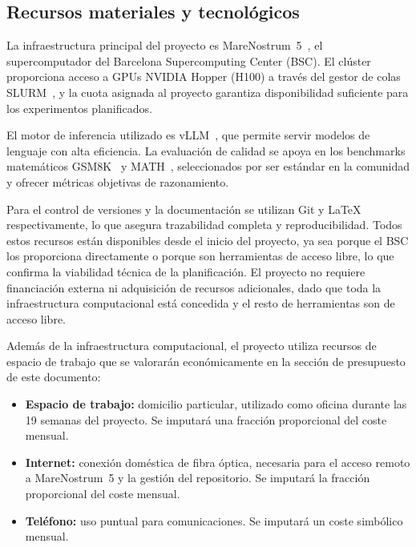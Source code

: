 \documentclass[11pt,a4paper]{article}
\begin{document}
\subsection{Recursos materiales y tecnológicos}

La infraestructura principal del proyecto es MareNostrum~5~\cite{mn5}, el supercomputador del Barcelona Supercomputing Center (BSC). El clúster proporciona acceso a GPUs NVIDIA Hopper (H100) a través del gestor de colas SLURM~\cite{slurm}, y la cuota asignada al proyecto garantiza disponibilidad suficiente para los experimentos planificados.

El motor de inferencia utilizado es vLLM~\cite{vllm2023}, que permite servir modelos de lenguaje con alta eficiencia. La evaluación de calidad se apoya en los benchmarks matemáticos GSM8K~\cite{cobbe2021gsm8k} y MATH~\cite{hendrycks2021math}, seleccionados por ser estándar en la comunidad y ofrecer métricas objetivas de razonamiento.

Para el control de versiones y la documentación se utilizan Git y LaTeX respectivamente, lo que asegura trazabilidad completa y reproducibilidad. Todos estos recursos están disponibles desde el inicio del proyecto, ya sea porque el BSC los proporciona directamente o porque son herramientas de acceso libre, lo que confirma la viabilidad técnica de la planificación. El proyecto no requiere financiación externa ni adquisición de recursos adicionales, dado que toda la infraestructura computacional está concedida y el resto de herramientas son de acceso libre.

Además de la infraestructura computacional, el proyecto utiliza recursos de espacio de trabajo que se valorarán económicamente en la sección de presupuesto de este documento:

\begin{itemize}[nosep]
\item \textbf{Espacio de trabajo:} domicilio particular, utilizado como oficina durante las 19 semanas del proyecto. Se imputará una fracción proporcional del coste mensual.
\item \textbf{Internet:} conexión doméstica de fibra óptica, necesaria para el acceso remoto a MareNostrum~5 y la gestión del repositorio. Se imputará la fracción proporcional del coste mensual.
\item \textbf{Teléfono:} uso puntual para comunicaciones. Se imputará un coste simbólico mensual.
\end{itemize}

\end{document}
